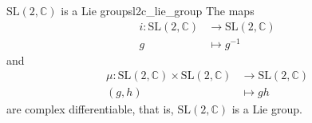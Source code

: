 \begin{proposition}{\(\mathrm{SL}(2, \mathbb{C})\) is a Lie group}{sl2c_lie_group}
    The maps
    \begin{align*}
        i : \mathrm{SL}(2, \mathbb{C}) &\to \mathrm{SL}(2, \mathbb{C})\\
                            g &\mapsto g^{-1}
    \end{align*}
    and
    \begin{align*}
        \mu : \mathrm{SL}(2, \mathbb{C}) \times \mathrm{SL}(2, \mathbb{C}) &\to \mathrm{SL}(2, \mathbb{C})\\
                                                   (g,h) &\mapsto gh
    \end{align*}
    are  complex differentiable, that is, \(\mathrm{SL}(2, \mathbb{C})\) is a Lie group.
\end{proposition}
